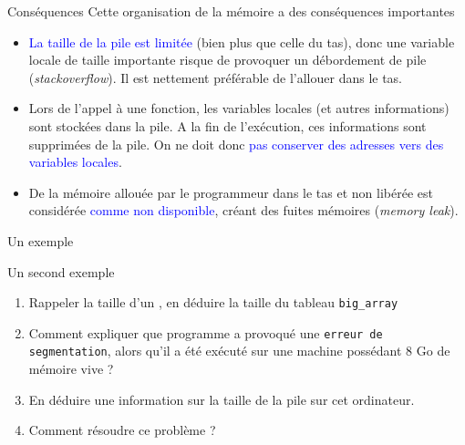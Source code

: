 \documentclass[10pt]{beamer}
\begin{document}
\begin{frame}{\Ctitle}{\stitle}
	\begin{block}{Conséquences}
		Cette organisation de la mémoire a des conséquences importantes
		\begin{itemize}
			\item<1-> \textcolor{blue}{La taille de la pile est limitée} (bien plus que celle du tas), donc une variable locale de taille importante risque de provoquer un débordement de pile (\textit{stackoverflow}). Il est nettement préférable de l'allouer dans le tas.
			\item<2-> Lors de l'appel à une fonction, les variables locales (et autres informations) sont stockées dans la pile. A la fin de l'exécution, ces informations sont supprimées de la pile. On ne doit donc \textcolor{blue}{pas conserver des adresses vers des variables locales}.
			\item<3-> De la mémoire allouée par le programmeur dans le tas et non libérée est considérée \textcolor{blue}{comme non disponible}, créant des fuites mémoires (\textit{memory leak}).
		\end{itemize}
	\end{block}
\end{frame}


\begin{frame}[fragile]{\Ctitle}{\stitle}
	\begin{exampleblock}{Un  exemple}
	\end{exampleblock}
\end{frame}

\begin{frame}[fragile]{\Ctitle}{\stitle}
	\begin{exampleblock}{Un second exemple}
		{\small
		\begin{enumerate}
			\item<1-> Rappeler la taille d'un , en déduire la taille du tableau {\tt big\_array}
			\item<2-> Comment expliquer que programme a provoqué une {\tt erreur de segmentation}, alors qu'il a été exécuté sur une machine possédant 8 Go de mémoire vive ?
			\item<3-> En déduire une information sur la taille de la pile sur cet ordinateur. 
			\item<4-> Comment résoudre ce problème ? 
		\end{enumerate}}
	\end{exampleblock}
\end{frame}
\end{document}
